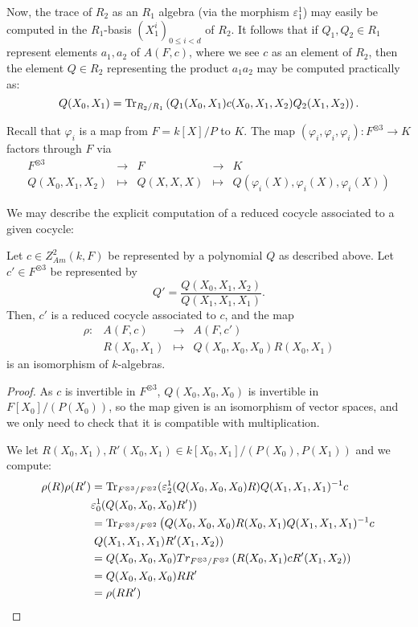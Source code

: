     Now, the trace of \(R_2\) as an \(R_1\) algebra (via the morphism \(\varepsilon_1^1\)) may easily be computed in the \(R_1\)-basis \((X_1^i)_{0 \leq i < d}\) of \(R_2\). It follows that if \(Q_1,Q_2 \in R_1\) represent elements \(a_1,a_2\) of \(A(F,c)\), where we see \(c\) as an element of \(R_2\), then the element \(Q \in R_2\) representing the product \(a_1a_2\) may be computed practically as:
    \[Q(X_0,X_1) = \operatorname{Tr}_{R_2/R_1}\left(Q_1(X_0,X_1)c(X_0,X_1,X_2)Q_2(X_1,X_2)\right).\]

    
    Recall that \(\varphi_i\) is a map from \(F = k[X]/P\) to \(K\). The map \((\varphi_i,\varphi_i,\varphi_i)\colon F^{\otimes 3} \to K\) factors through \(F\) via
    \[\begin{array}{ccccl} F^{\otimes 3} &\to &F &\to &K \\
        Q(X_0,X_1,X_2) &\mapsto &Q(X,X,X) &\mapsto &Q(\varphi_i(X),\varphi_i(X),\varphi_i(X)) \end{array}\]

    We may describe the explicit computation of a reduced cocycle associated to a given cocycle:
    \begin{theorem}\label{thm:ReducingCocycleExplicit}
        Let \(c \in Z_{Am}^2(k,F)\) be represented by a polynomial \(Q\) as described above. Let \(c' \in F^{\otimes 3}\) be represented by
        \[Q' = \frac{Q(X_0,X_1,X_2)}{Q(X_1,X_1,X_1)}.\]
        Then, \(c'\) is a reduced cocycle associated to \(c\), and the map
        \[\begin{array}{rlcl}
        \rho\colon &A(F,c) &\to &A(F,c') \\
        &R(X_0,X_1) &\mapsto &Q(X_0,X_0,X_0) R(X_0,X_1)
        \end{array}\]
        is an isomorphism of \(k\)-algebras.
    \end{theorem}

    \begin{proof}
        As \(c\) is invertible in \(F^{\otimes 3}\), \(Q(X_0,X_0,X_0)\) is invertible in \(F[X_0]/(P(X_0))\), so the map given is an isomorphism of vector spaces, and we only need to check that it is compatible with multiplication.

        We let \(R(X_0,X_1),R'(X_0,X_1) \in k[X_0,X_1]/(P(X_0),P(X_1))\) and we compute:
        \begin{align*}
            \rho(R) \rho(R') &= \operatorname{Tr}_{F^{\otimes 3}/F^{\otimes 2}}(\varepsilon_2^1(Q(X_0,X_0,X_0)R)Q(X_1,X_1,X_1)^{-1}c\\
            &\varepsilon_0^1(Q(X_0,X_0,X_0)R')) \\
            &= \operatorname{Tr}_{F^{\otimes 3}/F^{\otimes 2}}\left(Q(X_0,X_0,X_0)R(X_0,X_1)Q(X_1,X_1,X_1)^{-1}c\right.\\
            &\left.Q(X_1,X_1,X_1)R'(X_1,X_2)\right)\\
            &= Q(X_0,X_0,X_0) Tr_{F^{\otimes 3}/F^{\otimes 2}}\left(R(X_0,X_1)cR'(X_1,X_2)\right)\\
            &= Q(X_0,X_0,X_0) RR' \\
            &= \rho(RR')
        \end{align*}
    \end{proof}
